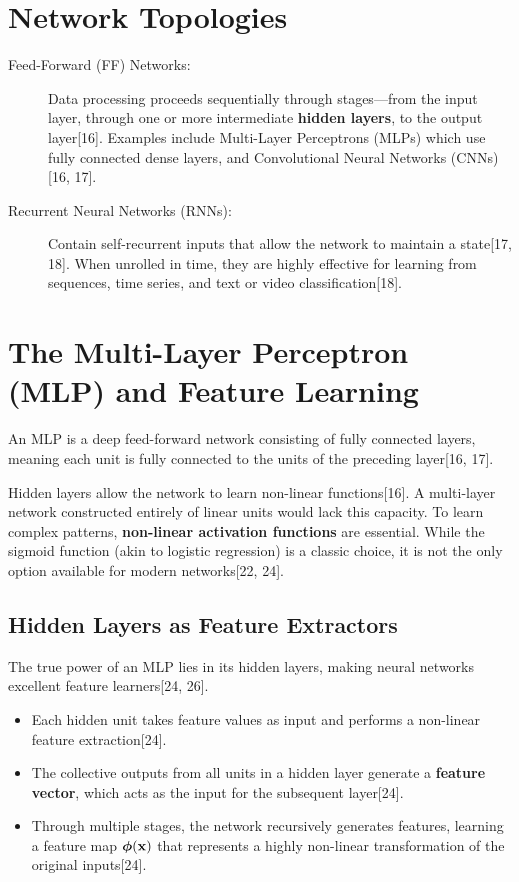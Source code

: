 \section*{Network Topologies}

\begin{description}
    \item[Feed-Forward (FF) Networks:] Data processing proceeds sequentially through stages—from the input layer, through one or more intermediate \textbf{hidden layers}, to the output layer[16]. Examples include Multi-Layer Perceptrons (MLPs) which use fully connected dense layers, and Convolutional Neural Networks (CNNs)[16, 17].
    \item[Recurrent Neural Networks (RNNs):] Contain self-recurrent inputs that allow the network to maintain a state[17, 18]. When unrolled in time, they are highly effective for learning from sequences, time series, and text or video classification[18].
\end{description}

\section*{The Multi-Layer Perceptron (MLP) and Feature Learning}

An MLP is a deep feed-forward network consisting of fully connected layers, meaning each unit is fully connected to the units of the preceding layer[16, 17].

\begin{remark}
Hidden layers allow the network to learn non-linear functions[16]. A multi-layer network constructed entirely of linear units would lack this capacity. To learn complex patterns, \textbf{non-linear activation functions} are essential. While the sigmoid function (akin to logistic regression) is a classic choice, it is not the only option available for modern networks[22, 24].
\end{remark}

\subsection*{Hidden Layers as Feature Extractors}
The true power of an MLP lies in its hidden layers, making neural networks excellent feature learners[24, 26].
\begin{itemize}
    \item Each hidden unit takes feature values as input and performs a non-linear feature extraction[24].
    \item The collective outputs from all units in a hidden layer generate a \textbf{feature vector}, which acts as the input for the subsequent layer[24].
    \item Through multiple stages, the network recursively generates features, learning a feature map $\boldsymbol{\phi}(\mathbf{x})$ that represents a highly non-linear transformation of the original inputs[24].
\end{itemize}

